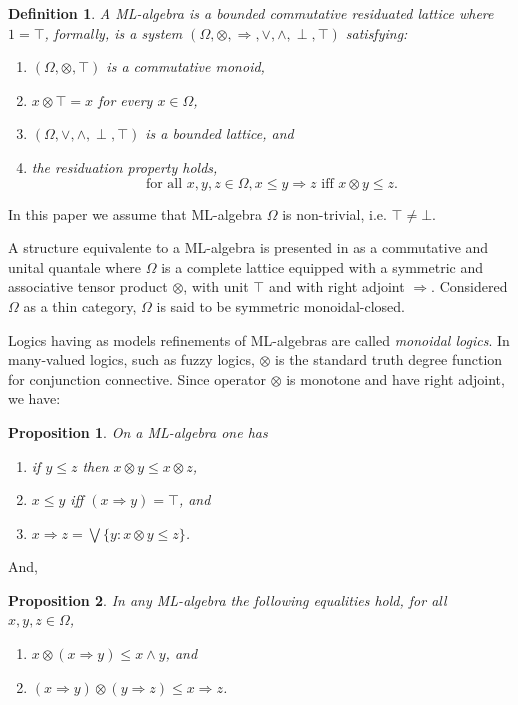 \documentclass[oribibl]{llncs}
\newtheorem{prop}{Proposition}
\newtheorem{defn}{Definition}
\begin{document}
\begin{defn}
A \emph{ML-algebra} is a bounded commutative residuated lattice where
$1=\top$, formally, is a system
$(\Omega,\otimes,\Rightarrow,\vee,\wedge,\perp,\top)$ satisfying:
\begin{enumerate}
  \item $(\Omega,\otimes,\top)$ is a commutative monoid,
  \item $x\otimes\top=x$ for every $x\in \Omega$,
  \item $(\Omega,\vee,\wedge,\perp,\top)$ is a bounded lattice,
  and
  \item the residuation property holds, \[\text{for all }x,y,z\in
  \Omega, x\leq y \Rightarrow z \text{ iff } x\otimes y\leq z.\]
\end{enumerate}
\end{defn}
In this paper we assume that ML-algebra $\Omega$ is non-trivial, i.e. $\top\neq\bot$.

A structure equivalente to a ML-algebra is presented in \cite{Clementino04} as a commutative and unital quantale where $\Omega$ is a complete lattice equipped with a symmetric and associative tensor product $\otimes$, with unit $\top$ and with right adjoint $\Rightarrow$. Considered $\Omega$ as a thin category, $\Omega$ is said to be symmetric monoidal-closed.

Logics having as models refinements of ML-algebras are called
\emph{monoidal logics}. In many-valued logics, such as fuzzy logics,
$\otimes$ is the standard truth degree function for conjunction
connective. Since operator $\otimes$ is monotone and have right adjoint, we have:

\begin{prop}
On a ML-algebra one has
\begin{enumerate}
  \item if $y\leq z$ then $x\otimes y\leq x\otimes z$,
  \item $x\leq y$ iff $(x \Rightarrow y)=\top$, and
  \item $x\Rightarrow z=\bigvee\{y:x\otimes y\leq z\}$.
\end{enumerate}
\end{prop}

And,

\begin{prop}\cite{klawonn??}\label{prop:implic}
In any ML-algebra the following equalities hold, for all  $x,y,z\in
\Omega$,
\begin{enumerate}
  \item $x\otimes(x\Rightarrow y)\leq x \wedge y$, and
  \item $(x\Rightarrow y)\otimes(y\Rightarrow z)\leq x\Rightarrow
  z$.
\end{enumerate}
\end{prop}
\end{document}
